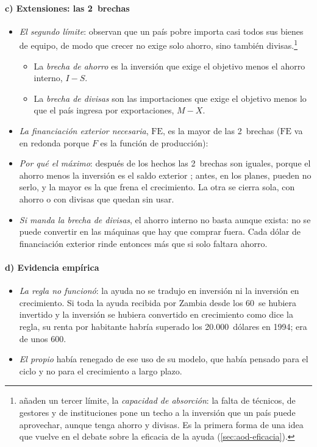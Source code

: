 \documentclass[11pt]{article}
\begin{document}
\paragraph{c) Extensiones: las 2~brechas}

\begin{itemize}
\item \emph{El segundo límite}: \textcite{CheneryStrout1966} observan que un país pobre importa casi todos sus bienes de equipo, de modo que crecer no exige solo ahorro, sino también divisas.\footnote{\textcite{CheneryStrout1966} añaden un tercer límite, la \emph{capacidad de absorción}: la falta de técnicos, de gestores y de instituciones pone un techo a la inversión que un país puede aprovechar, aunque tenga ahorro y divisas. Es la primera forma de una idea que vuelve en el debate sobre la eficacia de la ayuda (\ref{sec:aod-eficacia}).}
  \begin{itemize}
  \item La \emph{brecha de ahorro} es la inversión que exige el objetivo menos el ahorro interno, $I-S$.
  \item La \emph{brecha de divisas} son las importaciones que exige el objetivo menos lo que el país ingresa por exportaciones, $M-X$.
  \end{itemize}
\item \emph{La financiación exterior necesaria}, $\mathrm{FE}$, es la mayor de las 2~brechas ($\mathrm{FE}$ va en redonda porque $F$ es la función de producción):
\item \emph{Por qué el máximo}: después de los hechos las 2~brechas son iguales, porque el ahorro menos la inversión es el saldo exterior ; antes, en los planes, pueden no serlo, y la mayor es la que frena el crecimiento. La otra se cierra sola, con ahorro o con divisas que quedan sin usar.
\item \emph{Si manda la brecha de divisas}, el ahorro interno no basta aunque exista: no se puede convertir en las máquinas que hay que comprar fuera. Cada dólar de financiación exterior rinde entonces más que si solo faltara ahorro.
\end{itemize}

\paragraph{d) Evidencia empírica}

\begin{itemize}
\item \emph{La regla no funcionó}: la ayuda no se tradujo en inversión ni la inversión en crecimiento. Si toda la ayuda recibida por Zambia desde los 60~se hubiera invertido y la inversión se hubiera convertido en crecimiento como dice la regla, su renta por habitante habría superado los 20.000~dólares en 1994; era de unos 600\nocite{Easterly1999}.
\item \emph{El propio } había renegado de ese uso de su modelo, que había pensado para el ciclo y no para el crecimiento a largo plazo\nocite{Easterly2003}.
\end{itemize}
\end{document}
